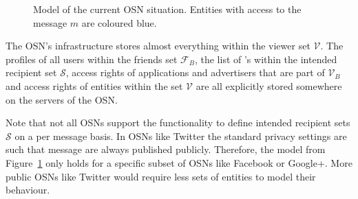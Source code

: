 \begin{figure}
\begin{center}
{
    }
    \end{center}
    \caption{Model of the current OSN situation. Entities with access to the message $m$ are coloured blue.}
    \label{fig:current_model}
\end{figure}

The OSN's infrastructure stores almost everything within the viewer set $\mathcal{V}$. The profiles of all users within the friends set $\mathcal{F}_B$, the list of \id{}'s within the intended recipient set $\mathcal{S}$, access rights of applications and advertisers that are part of $\mathcal{V}_B$ and access rights of entities within the set $\mathcal{V}$ are all explicitly stored somewhere on the servers of the OSN.

Note that not all OSNs support the functionality to define intended recipient sets $\mathcal{S}$ on a per message basis. In OSNs like Twitter the standard privacy settings are such that message are always published publicly. Therefore, the model from Figure~\ref{fig:current_model} only holds for a specific subset of OSNs like Facebook or Google+. More public OSNs like Twitter would require less sets of entities to model their behaviour.

